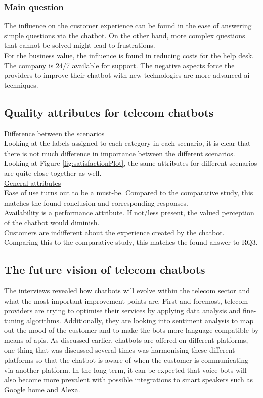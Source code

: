 \subsubsection{Main question}
The influence on the customer experience can be found in the ease of answering simple questions via the chatbot. On the other hand, more complex questions that cannot be solved might lead to frustrations.\\
For the business value, the influence is found in reducing costs for the help desk. The company is 24/7 available for support. The negative aspects force the providers to improve their chatbot with new technologies are more advanced \acrshort{ai} techniques.

\subsection{Quality attributes for telecom chatbots}
\ul{Difference between the scenarios}\\
Looking at the labels assigned to each category in each scenario, it is clear that there is not much difference in importance between the different scenarios. Looking at Figure \ref{fig:satisfactionPlot}, the same attributes for different scenarios are quite close together as well.\\
\break
\ul{General attributes}\\
Ease of use turns out to be a must-be. Compared to the comparative study, this matches the found conclusion and corresponding responses.\\
Availability is a performance attribute. If not/less present, the valued perception of the chatbot would diminish.\\
Customers are indifferent about the experience created by the chatbot. Comparing this to the comparative study, this matches the found answer to RQ3.

\subsection{The future vision of telecom chatbots}
The interviews revealed how chatbots will evolve within the telecom sector and what the most important improvement points are. First and foremost, telecom providers are trying to optimise their services by applying data analysis and fine-tuning algorithms. Additionally, they are looking into sentiment analysis to map out the mood of the customer and to make the bots more language-compatible by means of \acrshort{api}s. As discussed earlier, chatbots are offered on different platforms, one thing  that was discussed several times was harmonising these different platforms so that the chatbot is aware of when the customer is communicating via another platform. In the long term, it can be expected that voice bots will also become more prevalent with possible integrations to smart speakers such as Google home and Alexa.